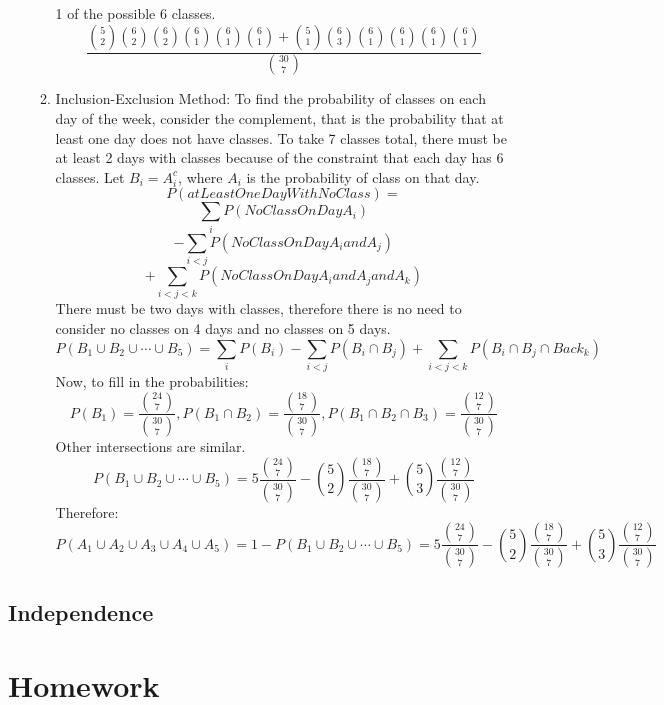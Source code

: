 \documentclass[11pt, oneside]{article}   	%
\begin{document}
\begin{enumerate}
\begin{enumerate}
					1 of the possible 6 classes.
					\[
						\frac{\binom{5}{2}\binom{6}{2}\binom{6}{2}\binom{6}{1}\binom{6}{1}\binom{6}{1} + \binom{5}{1}\binom{6}{3}\binom{6}{1}\binom{6}{1}\binom{6}{1}\binom{6}{1}}{\binom{30}{7}}
					\]
				\item Inclusion-Exclusion Method: To find the probability of classes on each day of the week, consider the complement, that is the probability that at least one day does not have classes.
					To take 7 classes total, there must be at least 2 days with classes because of the constraint that each day has 6 classes. Let $B_i = A_{i}^{c}$, where $A_i$ is the probability of class on that day.
					\[
						P(atLeastOneDayWithNoClass) = 
					\]
					\[
						\sum_{i}P(NoClassOnDay A_i)
					\]
					\[
						- \sum_{i<j}P(NoClassOnDay A_i and A_j)
					\]
					\[
						+ \sum_{i<j<k}P(NoClassOnDay A_i and A_j and A_k)
					\]
					There must be two days with classes, therefore there is no need to consider no classes on 4 days and no classes on 5 days.
					\[
						P(B_1 \cup B_2 \cup \cdots \cup B_5) = \sum_{i}P(B_i) - \sum_{i<j}P(B_i \cap B_j) + \sum_{i<j<k}P(B_i \cap B_j \cap Back_k)
					\]
					Now, to fill in the probabilities:
					\[
						P(B_1) = \frac{\binom{24}{7}}{\binom{30}{7}}, P(B_1 \cap B_2) = \frac{\binom{18}{7}}{\binom{30}{7}}, P(B_1 \cap B_2 \cap B_3) = \frac{\binom{12}{7}}{\binom{30}{7}}
					\]
					Other intersections are similar.
					\[
						P(B_1 \cup B_2 \cup \cdots \cup B_5)  = 5 \frac{\binom{24}{7}}{\binom{30}{7}} - \binom{5}{2} \frac{\binom{18}{7}}{\binom{30}{7}} + \binom{5}{3} \frac{\binom{12}{7}}{\binom{30}{7}}
					\]
					Therefore:
					\[
						P(A_1 \cup A_2 \cup A_3 \cup A_4 \cup A_5) = 1 - P(B_1 \cup B_2 \cup \cdots \cup B_5)  = 5 \frac{\binom{24}{7}}{\binom{30}{7}} - \binom{5}{2} \frac{\binom{18}{7}}{\binom{30}{7}} + \binom{5}{3} \frac{\binom{12}{7}}{\binom{30}{7}}
					\]
			\end{enumerate}
	\end{enumerate}
\subsection{Independence}
\pagebreak
\section{Homework}
\end{document}
